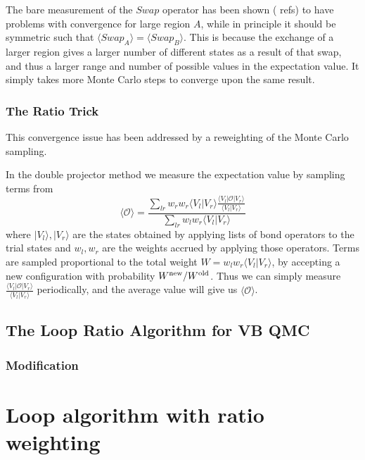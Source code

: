 \documentclass[prb,aps,twocolumn,floatfix,amsmath,amssymb,superscriptaddress,tightenlines]{revtex4}
\newcommand{\be}{\begin{equation}}
\newcommand{\ee}{\end{equation}}
\begin{document}
The bare measurement of the $Swap$ operator has been shown ({\color{red} refs}) to have problems with convergence for large region $A$, while in principle it should be symmetric such that $\langle Swap_A \rangle = \langle Swap_B \rangle$.
This is because the exchange of a larger region gives a larger number of different states as a result of that swap, and thus a larger range and number of possible values in the expectation value.
It simply takes more Monte Carlo steps to converge upon the same result.


\subsubsection{The Ratio Trick}
This convergence issue has been addressed by a reweighting of the Monte Carlo sampling.

In the double projector method we measure the expectation value by sampling terms from 
\be
\langle \mathcal{O} \rangle =\frac {\sum_{lr} w_r w_r\langle V_l  \lvert V_r\rangle\frac{  \langle V_l  \lvert \mathcal{O} \lvert V_r\rangle}{ \langle V_l  \lvert V_r\rangle}}
		{\sum_{lr} w_l w_r \langle V_l  \lvert V_r\rangle}
\ee
where $\lvert V_l \rangle, \lvert V_r \rangle$ are the states obtained by applying lists of bond operators to the trial states and $w_l , w_r $ are the weights accrued by applying those operators.
Terms are sampled proportional to the total weight $W = w_l w_r \langle V_l  \lvert V_r\rangle$, by accepting a new configuration with probability $W^{\rm new}/W^{\rm old}$.
Thus we can simply measure $\tfrac{  \langle V_l  \lvert \mathcal{O} \lvert V_r\rangle}{ \langle V_l  \lvert V_r\rangle}$ periodically, and the average value will give us $\langle \mathcal{O} \rangle$.






\subsection{The Loop Ratio Algorithm for VB QMC}
\subsubsection{Modification}


\newpage
\section{Loop algorithm with ratio weighting}
\end{document}
